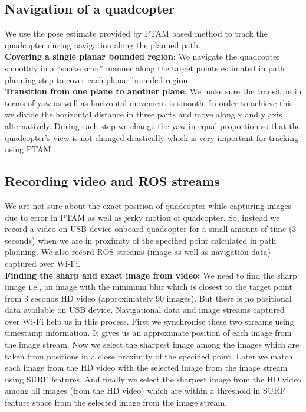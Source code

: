 \subsection{Navigation of a quadcopter}
 We use the pose estimate provided by PTAM  based method \cite{engel}to track
 the quadcopter during navigation along the planned path.\\
\textbf{Covering a single planar bounded region}:
We navigate the quadcopter smoothly in a ``snake scan'' manner along the target points estimated in path
planning step to cover each planar bounded region.\\
\textbf{Transition from one plane to another plane}: We make sure the
transition in terms of yaw as well as horizontal movement is smooth. In order to achieve this
we divide the horizontal distance in three parts and  move along x and y axis
alternatively. During each step we change the yaw in equal proportion so that
the quadcopter’s view is not changed drastically which is very important for
tracking using PTAM \cite{engel}.

\subsection{Recording video and ROS streams}
 We are not sure about the exact position of quadcopter while capturing
 images due to error in PTAM as well as jerky motion of quadcopter.  So,
 instead we record a video on USB device onboard quadcopter for a small amount
 of time (3 seconds) when we are in proximity of the specified point calculated in path planning. We
also record ROS streams (image as well as navigation data) captured over Wi-Fi.\\
\textbf{Finding the sharp and exact image from video:} We need to find the sharp
image i.e., an image with the minimum blur which is closest to the target point
from 3 seconds HD video (approximately 90 images). But there is no positional data
available on USB device. Navigational data and image streams captured over Wi-Fi help us
in this process. First we synchronise these two streams using timestamp
information. It gives us an approximate position of each image from the image
stream. Now we select the sharpest image among the images which are taken from
positions in a close proximity of the specified point. Later we match each
image from the HD video with the selected image from the image stream using SURF
features. And finally we select the sharpest image from the HD video among
all images (from the HD video) which are within a threshold in SURF\cite{Bay}
feature space from the selected image from the image stream.

